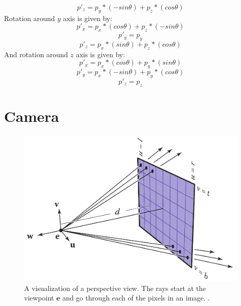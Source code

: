\documentclass[11pt,a4paper]{article}
\begin{document}
	\begin{equation}
	p'_{z} = p_{y}*(-sin\theta) + p_{z}*(cos\theta)
	\end{equation}
	Rotation around $y$ axis is given by:
	\begin{equation}
	p'_{x} = p_{x}*(cos\theta) + p_{z}*(-sin\theta)
	\end{equation}
	\begin{equation}
	p'_{y} = p_{y}
	\end{equation}
	\begin{equation}
	p'_{z} = p_{x}*(sin\theta) + p_{z}*(cos\theta)
	\end{equation}
	And rotation around $z$ axis is given by:
	\begin{equation}
	p'_{x} = p_{x}*(cos\theta) + p_{y}*(sin\theta)
	\end{equation}
	\begin{equation}
	p'_{y} = p_{x}*(-sin\theta) + p_{y}*(cos\theta)
	\end{equation}
	\begin{equation}
	p'_{z} = p_{z}
	\end{equation}
	
	\pagebreak
	\section{Camera}
	
	\begin{figure}
		\centering
		\includegraphics[width=0.8\linewidth]{camera_rays} 
		\caption{A visualization of a perspective view. The rays start at the viewpoint $\boldsymbol{e}$ and go through each of the pixels in an image. \protect\cite{marschner2018fundamentals}.}
		\label{fig:wrapfig2}
	\end{figure}
	
\end{document}
